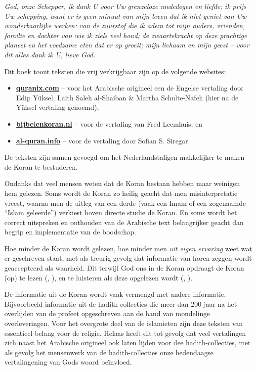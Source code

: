 
\emph{God, onze Schepper, ik dank U voor Uw grenzeloze mededogen en liefde; ik prijs Uw schepping, want er is geen minuut van mijn leven dat ik niet geniet van Uw wonderbaarlijke werken: van de zuurstof die ik adem tot mijn ouders, vrienden, familie en dochter van wie ik ziels veel houd; de zwaartekracht op deze prachtige planeet en het voedzame eten dat er op groeit; mijn lichaam en mijn geest -- voor dit alles dank ik U, lieve God.}
\vspace{1cm}

\noindent Dit boek toont teksten die vrij verkrijgbaar zijn op de volgende websites:
\begin{itemize}
  \item \href{http://quranix.com}{\textbf{quranix.com}} -- voor het Arabische origineel een de Engelse vertaling door Edip Yüksel, Laith Saleh al{-}Shaiban \& Martha Schulte{-}Nafeh (hier na de Yüksel vertaling genoemd),
  \item \href{http://bijbelenkoran.nl}{\textbf{bijbelenkoran.nl}} -- voor de vertaling van Fred Leemhuis, en
  \item \href{http://al-quran.info}{\textbf{al-quran.info}} -- voor de vertaling door Sofian S. Siregar.
\end{itemize}
De teksten zijn samen gevoegd om het Nederlandstaligen makkelijker te maken de Koran te bestuderen.
\vspace{0.3cm}

\noindent Ondanks dat veel mensen weten dat de Koran bestaan hebben maar weinigen hem gelezen.  Soms wordt de Koran zo heilig geacht dat men misinterpretatie vreest, waarna men de uitleg van een derde (vaak een Imam of een zogenaamde ``Islam geleerde'') verkiest boven directe studie de Koran.  En soms wordt het correct uitspreken en onthouden van de Arabische text belangrijker geacht dan begrip en implementatie van de boodschap.

Hoe minder de Koran wordt gelezen, hoe minder men \emph{uit eigen ervaring} weet wat er geschreven staat, met als treurig gevolg dat informatie van horen-zeggen wordt geaccepteerd als waarheid.  Dit terwijl God ons in de Koran opdraagt de Koran (op) te lezen (, ), en te luisteren als deze opgelezen wordt (, ).

De informatie uit de Koran wordt vaak vermengd met andere informatie.  Bijvoorbeeld informatie uit de hadith-collecties die meer dan 200 jaar na het overlijden van de profeet opgeschreven aan de hand van mondelinge overleveringen.  Voor het overgrote deel van de islamieten zijn deze teksten van essentieel belang voor de religie.  Helaas heeft dit tot gevolg dat veel vertalingen zich naast het Arabische origineel ook laten lijden voor dee hadith-collecties, met als gevolg het mensenwerk van de hadith-collecties onze hedendaagse vertalingening van Gods woord beïnvloed.

